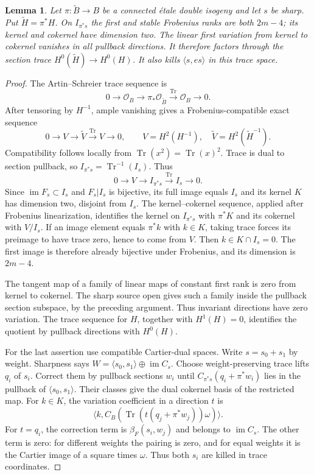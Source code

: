 \documentclass[11pt]{article}
\newtheorem{lemma}[theorem]{Lemma}
\theoremstyle{definition}\newtheorem{definition}[theorem]{Definition}
\theoremstyle{remark}\newtheorem{remark}[theorem]{Remark}
\newcommand{\OO}{\mathcal O}
\begin{document}
\begin{lemma}\label{lem:double}
Let $\pi:\widetilde B\to B$ be a connected \'etale double isogeny and let $s$ be sharp. Put $\widetilde H=\pi^*H$. On $I_{\pi^*s}$ the first and stable Frobenius ranks are both $2m-4$; its kernel and cokernel have dimension two. The linear first variation from kernel to cokernel vanishes in all pullback directions. It therefore factors through the section trace $H^0(\widetilde H)\to H^0(H)$. It also kills $\langle s,es\rangle$ in this trace space.
\end{lemma}
\begin{proof}
The Artin--Schreier trace sequence is
\[
 0\to\OO_B\to\pi_*\OO_{\widetilde B}\xrightarrow{\operatorname{Tr}}\OO_B\to0.
\]
After tensoring by $H^{-1}$, ample vanishing gives a Frobenius-compatible exact sequence
\[
 0\to V\longrightarrow\widetilde V\xrightarrow{\operatorname{Tr}}V\to0,
 \qquad V=H^2(H^{-1}),\quad\widetilde V=H^2(\widetilde H^{-1}).
\]
Compatibility follows locally from $\operatorname{Tr}(x^2)=\operatorname{Tr}(x)^2$. Trace is dual to section pullback, so $I_{\pi^*s}=\operatorname{Tr}^{-1}(I_s)$. Thus
\[
 0\to V\longrightarrow I_{\pi^*s}\xrightarrow{\operatorname{Tr}}I_s\to0.
\]
Since $\operatorname{im}F_s\subset I_s$ and $F_s|I_s$ is bijective, its full image equals $I_s$ and its kernel $K$ has dimension two, disjoint from $I_s$. The kernel--cokernel sequence, applied after Frobenius linearization, identifies the kernel on $I_{\pi^*s}$ with $\pi^*K$ and its cokernel with $V/I_s$. If an image element equals $\pi^*k$ with $k\in K$, taking trace forces its preimage to have trace zero, hence to come from $V$. Then $k\in K\cap I_s=0$. The first image is therefore already bijective under Frobenius, and its dimension is $2m-4$.

The tangent map of a family of linear maps of constant first rank is zero from kernel to cokernel. The sharp source open gives such a family inside the pullback section subspace, by the preceding argument. Thus invariant directions have zero variation. The trace sequence for $H$, together with $H^1(H)=0$, identifies the quotient by pullback directions with $H^0(H)$.

For the last assertion use compatible Cartier-dual spaces. Write $s=s_0+s_1$ by weight. Sharpness says
$W=\langle s_0,s_1\rangle\oplus\operatorname{im}C_s$.
Choose weight-preserving trace lifts $q_i$ of $s_i$. Correct them by pullback sections $w_i$ until $C_{\pi^*s}(q_i+\pi^*w_i)$ lies in the pullback of $\langle s_0,s_1\rangle$. Their classes give the dual cokernel basis of the restricted map. For $k\in K$, the variation coefficient in a direction $t$ is
\[
 \big\langle k,C_B(\operatorname{Tr}(t(q_j+\pi^*w_j))\omega)\big\rangle.
\]
For $t=q_i$, the correction term is $\beta_F(s_i,w_j)$ and belongs to $\operatorname{im}C_s$. The other term is zero: for different weights the pairing is zero, and for equal weights it is the Cartier image of a square times $\omega$. Thus both $s_i$ are killed in trace coordinates.
\end{proof}
\end{document}
